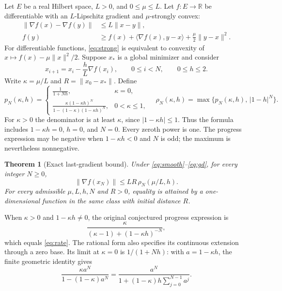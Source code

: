 \documentclass[11pt]{article}
\numberwithin{equation}{section}
\newtheorem{theorem}{Theorem}[section]
\theoremstyle{remark}
\newcommand{\R}{\mathbb R}
\newcommand{\ip}[2]{\langle #1,#2\rangle}
\newcommand{\norm}[1]{\lVert #1\rVert}
\newcommand{\grad}{\nabla}
\begin{document}
Let $E$ be a real Hilbert space, $L>0$, and $0\leq\mu\leq L$.
Let $f:E\to\R$ be differentiable with an $L$-Lipschitz gradient and
$\mu$-strongly convex:
\begin{align}
\norm{\grad f(x)-\grad f(y)}&\leq L\norm{x-y},\label{eq:smooth}\\
f(y)&\geq f(x)+\ip{\grad f(x)}{y-x}+\frac\mu2\norm{y-x}^2.
\label{eq:strong}
\end{align}
For differentiable functions, \eqref{eq:strong} is equivalent to
convexity of $x\mapsto f(x)-\mu\norm{x}^2/2$. Suppose $x_*$ is a
global minimizer and consider
\begin{equation}
x_{i+1}=x_i-\frac hL\grad f(x_i),\qquad 0\leq i<N,\qquad 0\leq h\leq2.
\label{eq:gd}
\end{equation}
Write $\kappa=\mu/L$ and $R=\norm{x_0-x_*}$. Define
\begin{equation}
p_N(\kappa,h)=
\begin{cases}
\displaystyle\frac1{1+Nh},&\kappa=0,\\[6pt]
\displaystyle\frac{\kappa(1-\kappa h)^N}
 {1-(1-\kappa)(1-\kappa h)^N},&0<\kappa\leq1,
\end{cases}
\quad
\rho_N(\kappa,h)=\max\{p_N(\kappa,h),\,|1-h|^N\}.
\label{eq:rate}
\end{equation}
For $\kappa>0$ the denominator is at least $\kappa$, since
$|1-\kappa h|\leq1$. Thus the formula includes $1-\kappa h=0$,
$h=0$, and $N=0$. Every zeroth power is one. The progress expression
may be negative when $1-\kappa h<0$ and $N$ is odd; the maximum is
nevertheless nonnegative.

\begin{theorem}[Exact last-gradient bound]
\label{thm:main}
Under \eqref{eq:smooth}--\eqref{eq:gd}, for every integer $N\geq0$,
\begin{equation}
\norm{\grad f(x_N)}\leq LR\,\rho_N(\mu/L,h).
\label{eq:main}
\end{equation}
For every admissible $\mu,L,h,N$ and $R>0$, equality is attained by
a one-dimensional function in the same class with initial distance $R$.
\end{theorem}

When $\kappa>0$ and $1-\kappa h\neq0$, the original conjectured
progress expression is
\[
\frac{\kappa}{(\kappa-1)+(1-\kappa h)^{-N}},
\]
which equals \eqref{eq:rate}. The rational form also specifies its
continuous extension through a zero base. Its limit at $\kappa=0$
is $1/(1+Nh)$: with $a=1-\kappa h$, the finite geometric identity gives
\begin{equation}
\frac{\kappa a^N}{1-(1-\kappa)a^N}
=\frac{a^N}{1+(1-\kappa)h\sum_{j=0}^{N-1}a^j}.
\label{eq:continuous-rate}
\end{equation}
\end{document}
